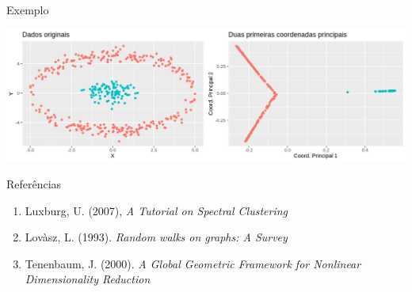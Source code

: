 \documentclass[11pt]{beamer}
\begin{document}
\begin{frame}{Exemplo}

\includegraphics[scale=0.42]{isomap_result}

\end{frame}

\begin{frame}{Referências}

\begin{enumerate}
\item Luxburg, U. (2007), \textit{A Tutorial on Spectral Clustering}

\vspace{1cm}

\item Lovàsz, L. (1993). \textit{Random walks on graphs: A Survey}

\vspace{1cm}

\item Tenenbaum, J. (2000). \textit{A Global Geometric Framework for Nonlinear Dimensionality Reduction}
\end{enumerate}

\end{frame}
\end{document}
